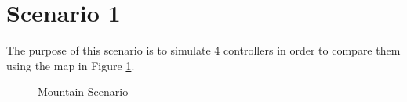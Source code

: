\section{Scenario 1}\label{sec:scenario1}
The purpose of this scenario is to simulate 4 controllers in order to compare them using the map in Figure \ref{fig:s1_map}. 

\begin{figure}[H]
	\hfill
	\hfill
	\hfill
	\caption{Mountain Scenario}
	\label{fig:s1_map}
\end{figure}

